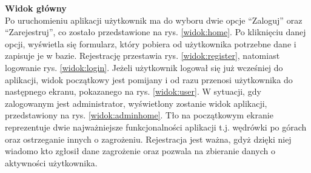 \textbf{Widok główny}\\
\indent Po uruchomieniu aplikacji użytkownik ma do wyboru dwie opcje “Zaloguj” oraz “Zarejestruj”, co zostało przedstawione na rys. \ref{widok:home}. Po kliknięciu danej opcji, wyświetla się formularz, który pobiera od użytkownika potrzebne dane i zapisuje je w bazie. Rejestrację przestawia rys. \ref{widok:register}, natomiast logowanie rys. \ref{widok:login}. Jeżeli użytkownik logował się już wcześniej do aplikacji, widok początkowy jest pomijany i od razu przenosi użytkownika do następnego ekranu, pokazanego na rys. \ref{widok:user}. W sytuacji, gdy zalogowanym jest administrator, wyświetlony zostanie widok aplikacji, przedstawiony na rys. \ref{widok:adminhome}. Tło na początkowym ekranie reprezentuje dwie najważniejsze funkcjonalności aplikacji t.j. wędrówki po górach oraz ostrzeganie innych o zagrożeniu. Rejestracja jest ważna, gdyż dzięki niej wiadomo kto zgłosił dane zagrożenie oraz pozwala na zbieranie danych o aktywności użytkownika.\\

